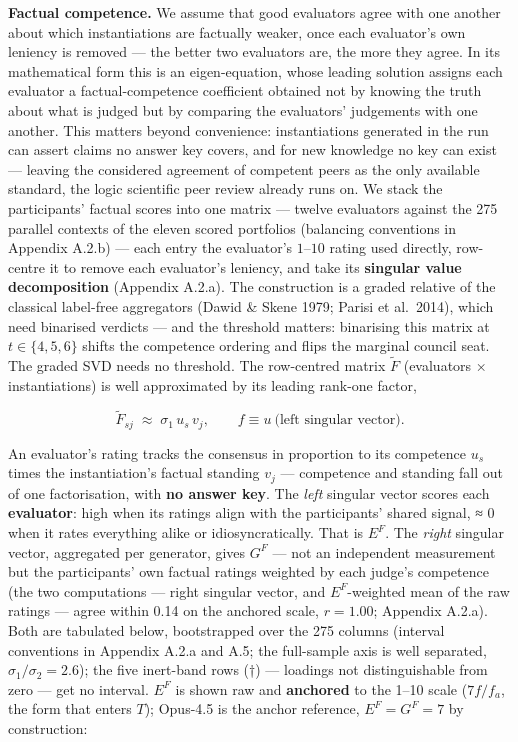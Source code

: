 \textbf{Factual competence.} We assume that good evaluators agree with one another about which instantiations are factually weaker, once each evaluator's own leniency is removed --- the better two evaluators are, the more they agree. In its mathematical form this is an eigen-equation, whose leading solution assigns each evaluator a factual-competence coefficient obtained not by knowing the truth about what is judged but by comparing the evaluators' judgements with one another. This matters beyond convenience: instantiations generated in the run can assert claims no answer key covers, and for new knowledge no key can exist --- leaving the considered agreement of competent peers as the only available standard, the logic scientific peer review already runs on. We stack the participants' factual scores into one matrix --- twelve evaluators against the 275 parallel contexts of the eleven scored portfolios (balancing conventions in Appendix A.2.b) --- each entry the evaluator's \(1\)--\(10\) rating used directly, row-centre it to remove each evaluator's leniency, and take its \textbf{singular value decomposition} (Appendix A.2.a). The construction is a graded relative of the classical label-free aggregators (Dawid \& Skene 1979; Parisi et al.~2014), which need binarised verdicts --- and the threshold matters: binarising this matrix at \(t \in \{4,5,6\}\) shifts the competence ordering and flips the marginal council seat. The graded SVD needs no threshold. The row-centred matrix \(\tilde F\) (evaluators × instantiations) is well approximated by its leading rank-one factor,

\[\tilde F_{sj} \;\approx\; \sigma_1\, u_s\, v_j, \qquad f \equiv u\ \text{(left singular vector).} \tag{1}\]

An evaluator's rating tracks the consensus in proportion to its competence \(u_s\) times the instantiation's factual standing \(v_j\) --- competence and standing fall out of one factorisation, with \textbf{no answer key}. The \emph{left} singular vector scores each \textbf{evaluator}: high when its ratings align with the participants' shared signal, ≈ 0 when it rates everything alike or idiosyncratically. That is \(E^{F}\). The \emph{right} singular vector, aggregated per generator, gives \(G^{F}\) --- not an independent measurement but the participants' own factual ratings weighted by each judge's competence (the two computations --- right singular vector, and \(E^{F}\)-weighted mean of the raw ratings --- agree within 0.14 on the anchored scale, \(r = 1.00\); Appendix A.2.a). Both are tabulated below, bootstrapped over the 275 columns (interval conventions in Appendix A.2.a and A.5; the full-sample axis is well separated, \(\sigma_1/\sigma_2 = 2.6\)); the five inert-band rows (†) --- loadings not distinguishable from zero --- get no interval. \(E^{F}\) is shown raw and \textbf{anchored} to the 1--10 scale (\(7f/f_a\), the form that enters \(T\)); Opus-4.5 is the anchor reference, \(E^{F}=G^{F}=7\) by construction:

